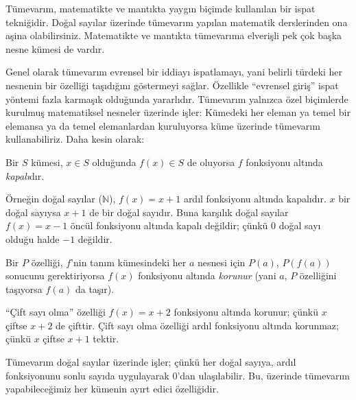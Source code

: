 \documentclass[../../../include/open-logic-section]{subfiles}
\begin{document}


\begin{explain}
Tümevarım, matematikte ve mantıkta yaygın biçimde kullanılan bir ispat
tekniğidir. Doğal sayılar üzerinde tümevarım yapılan matematik derslerinden
ona aşina olabilirsiniz. Matematikte ve mantıkta tümevarıma elverişli pek çok
başka nesne kümesi de vardır.

Genel olarak tümevarım evrensel bir iddiayı ispatlamayı, yani belirli türdeki
her nesnenin bir özelliği taşıdığını göstermeyi sağlar. Özellikle ``evrensel
giriş'' ispat yöntemi fazla karmaşık olduğunda yararlıdır. Tümevarım yalnızca
özel biçimlerde kurulmuş matematiksel nesneler üzerinde işler: Kümedeki her
eleman ya temel bir elemansa ya da temel elemanlardan kuruluyorsa küme
üzerinde tümevarım kullanabiliriz. Daha kesin olarak:
\end{explain}

\begin{defn}
Bir $S$ kümesi, $x \in S$ olduğunda $f(x) \in S$ de oluyorsa $f$
fonksiyonu altında \emph{kapalı}dır.
\end{defn}

\begin{explain}
Örneğin doğal sayılar ($\mathbb{N}$), $f(x) = x+1$ ardıl fonksiyonu altında
kapalıdır. $x$ bir doğal sayıysa $x+1$ de bir doğal sayıdır. Buna karşılık
doğal sayılar $f(x) = x-1$ öncül fonksiyonu altında kapalı değildir; çünkü
$0$ doğal sayı olduğu halde $-1$ değildir.
\end{explain}

\begin{defn}
Bir $P$ özelliği, $f$'nin tanım kümesindeki her $a$ nesnesi için $P(a)$,
$P(f(a))$ sonucunu gerektiriyorsa $f(x)$ fonksiyonu altında \emph{korunur}
(yani $a$, $P$ özelliğini taşıyorsa $f(a)$ da taşır).
\end{defn}

\begin{explain}
``Çift sayı olma'' özelliği $f(x) = x+2$ fonksiyonu altında korunur; çünkü
$x$ çiftse $x+2$ de çifttir. Çift sayı olma özelliği ardıl fonksiyonu altında
korunmaz; çünkü $x$ çiftse $x+1$ tektir.

Tümevarım doğal sayılar üzerinde işler; çünkü her doğal sayıya, ardıl
fonksiyonunu sonlu sayıda uygulayarak $0$'dan ulaşılabilir. Bu, üzerinde
tümevarım yapabileceğimiz her kümenin ayırt edici özelliğidir.
\end{explain}
\end{document}
